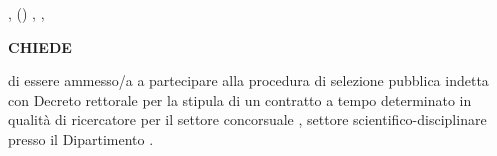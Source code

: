 	\noindent \myTextField[.5cm]{}   ,  () , ,
	\begin{center}
		\textbf{CHIEDE}
	\end{center}
	di essere ammesso/a a partecipare alla procedura di selezione pubblica indetta con Decreto rettorale   per la stipula di un 	contratto a tempo determinato in qualità di ricercatore per il settore concorsuale	, settore scientifico-disciplinare  presso il Dipartimento .
